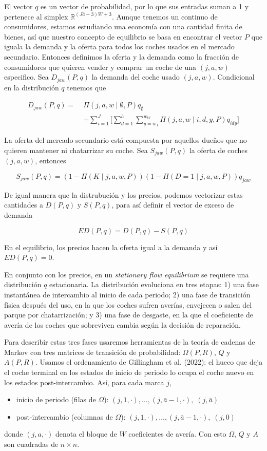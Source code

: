 \documentclass{article}
\begin{document}
El vector $q$ es un vector de probabilidad, por lo que sus entradas suman a 1 y pertenece al simplex $\mathbb{R}^{(J\bar{a}-3)W+3}$. Aunque tenemos un continuo de consumidores, estamos estudiando una economía con una cantidad finita de bienes, así que nuestro concepto de equilibrio se basa en encontrar el vector $P$ que iguala la demanda y la oferta para todos los coches usados en el mercado secundario. Entonces definimos la oferta y la demanda como la fracción de consumidores que quieren vender y comprar un coche de una $(j,a,w)$ especifico. Sea $D_{jaw}(P,q)$ la demanda del coche usado $(j,a,w)$. Condicional en la distribución $q$ tenemos que

$$\begin{aligned}D_{jaw}(P,q)=\;&\Pi(j,a,w\mid\emptyset,P)q_{\emptyset}\\&+\sum_{i=1}^{J}\Big[\sum_{d=1}^{\bar{a}}\sum_{y=w_1}^{w_W}\Pi(j,a,w\mid i,d,y,P)q_{idy}\Big]\end{aligned}$$

La oferta del mercado secundario está compuesta por aquellos dueños que no quieren mantener ni chatarrizar su coche. Sea $S_{jaw}(P,q)$ la oferta de coches $(j,a,w)$, entonces

$$S_{jaw}(P,q)=(1-\Pi(K\mid j,a,w,P))(1-\Pi(D=1\mid j,a,w,P))q_{jaw}$$

De igual manera que la distrubución y los precios, podemos vectorizar estas cantidades a $D(P,q)$ y $S(P,q)$, para así definir el vector de exceso de demanda

$$ED(P,q)=D(P,q)-S(P,q)$$

En el equilibrio, los precios hacen la oferta igual a la demanda y así $ED(P,q)=0$.

En conjunto con los precios, en un \textit{stationary flow equilibrium} se requiere una distribución $q$ estacionaria. La distribución evoluciona en tres etapas: 1) una fase instantánea de intercambio al inicio de cada periodo; 2) una fase de transición física después del uso, en la que los coches sufren averías, envejecen o salen del parque por chatarrización; y 3) una fase de desgaste, en la que el coeficiente de avería de los coches que sobreviven cambia según la decisión de reparación.

Para describir estas tres fases usaremos herramientas de la teoría de cadenas de Markov con tres matrices de transición de probabilidad: $\Omega(P,R)$, $Q$ y $A(P,R)$. Usamos el ordenamiento de Gillingham et al. (2022): el hueco que deja el coche terminal en los estados de inicio de periodo lo ocupa el coche nuevo en los estados post-intercambio. Así, para cada marca $j$,
\begin{itemize}
    \item inicio de periodo (filas de $\Omega$): $(j,1,\cdot),\dots,(j,\bar{a}-1,\cdot),\;(j,\bar{a})$
    \item post-intercambio (columnas de $\Omega$): $(j,1,\cdot),\dots,(j,\bar{a}-1,\cdot),\;(j,0)$
\end{itemize}
donde $(j,a,\cdot)$ denota el bloque de $W$ coeficientes de avería. Con esto $\Omega$, $Q$ y $A$ son cuadradas de $n\times n$.
\end{document}
